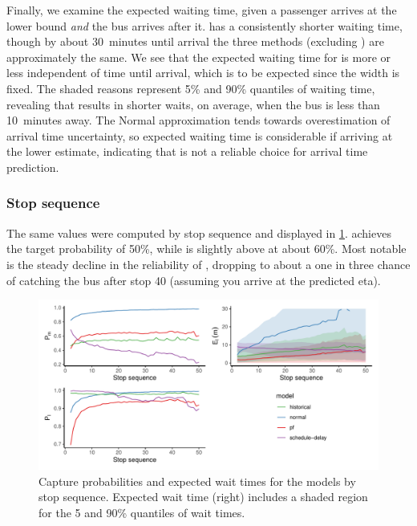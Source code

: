 Finally, we examine the expected waiting time, given a passenger arrives at the lower bound \emph{and} the bus arrives after it. \Fpf{} has a consistently shorter waiting time, though by about 30~minutes until arrival the three methods (excluding \Fnorm{}) are approximately the same. We see that the expected waiting time for \Fsched{} is more or less independent of time until arrival, which is to be expected since the width is fixed. The shaded reasons represent 5\% and 90\% quantiles of waiting time, revealing that \Fpf{} results in shorter waits, on average, when the bus is less than 10~minutes away. The Normal approximation tends towards overestimation of arrival time uncertainty, so expected waiting time is considerable if arriving at the lower estimate, indicating that \Fnorm{} is not a reliable choice for arrival time prediction.


\subsubsection{Stop sequence}

The same values were computed by stop sequence and displayed in \cref{fig:model_results_pr_stop}. \Fhist{} achieves the target probability of 50\%, while \Fpf{} is slightly above at about 60\%. Most notable is the steady decline in the reliability of \Fsched{}, dropping to about a one in three chance of catching the bus after stop 40 (assuming you arrive at the predicted \gls{eta}).


\begin{knitrout}\small
{}\color{fgcolor}\begin{figure}
\includegraphics[width=\textwidth]{figure/model_results_pr_stop-1} \caption[Capture probabilities and expected wait times for the models by stop sequence]{Capture probabilities and expected wait times for the models by stop sequence. Expected wait time (right) includes a shaded region for the 5 and 90\% quantiles of wait times.}\label{fig:model_results_pr_stop}
\end{figure}


\end{knitrout}

